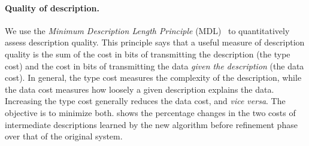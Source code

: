 \paragraph*{Quality of description.}
We use the {\em Minimum Description Length Principle}
(MDL)~\cite{mdlbook} to quantitatively assess description quality.
This principle says that a useful measure of description quality is
the sum of the cost in bits of transmitting the description (the
type cost) and the cost in bits of transmitting the data
\textit{given the description} (the data cost).  In general, the
type cost measures the complexity of the description, while the data
cost measures how loosely a given description explains the data.
Increasing the type cost generally reduces the data cost, and
\textit{vice versa}. The objective is to minimize both.
 shows the
percentage changes in the two costs of intermediate descriptions learned by
the new algorithm before refinement phase over that of the original \learnpads{} system.

